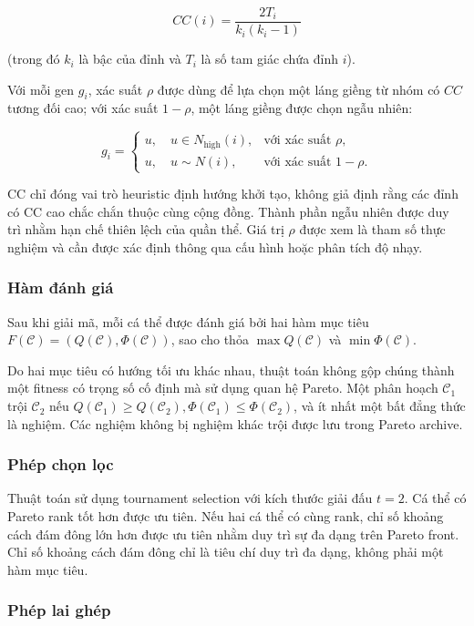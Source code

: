 \documentclass[14pt,a4paper]{extarticle}
\begin{document}
\[
CC(i)=\frac{2T_i}{k_i(k_i-1)}
\]

(trong đó $k_i$ là bậc của đỉnh và $T_i$ là số tam giác chứa đỉnh $i$).

Với mỗi gen $g_i$, xác suất $\rho$ được dùng để lựa chọn một láng giềng từ nhóm có $CC$ tương đối cao; với xác suất $1-\rho$, một láng giềng được chọn ngẫu nhiên:

\[
g_i=
\begin{cases}
u,\quad u\in N_{\mathrm{high}}(i), & \text{với xác suất }\rho,\\
u,\quad u\sim N(i), & \text{với xác suất }1-\rho.
\end{cases}
\]

CC chỉ đóng vai trò heuristic định hướng khởi tạo, không giả định rằng các đỉnh có CC cao chắc chắn thuộc cùng cộng đồng. Thành phần ngẫu nhiên được duy trì nhằm hạn chế thiên lệch của quần thể. Giá trị $\rho$ được xem là tham số thực nghiệm và cần được xác định thông qua cấu hình hoặc phân tích độ nhạy.

\subsubsection{Hàm đánh giá}

Sau khi giải mã, mỗi cá thể được đánh giá bởi hai hàm mục tiêu $
F(\mathcal C)=
\left(
Q(\mathcal C),\Phi(\mathcal C)
\right)
$, sao cho thỏa $
\max Q(\mathcal C)$ và $\min \Phi(\mathcal C).$

Do hai mục tiêu có hướng tối ưu khác nhau, thuật toán không gộp chúng thành một fitness có trọng số cố định mà sử dụng quan hệ Pareto. Một phân hoạch $\mathcal C_1$ trội $\mathcal C_2$ nếu $
Q(\mathcal C_1)\ge Q(\mathcal C_2), 
\Phi(\mathcal C_1)\le\Phi(\mathcal C_2)
$, và ít nhất một bất đẳng thức là nghiệm. Các nghiệm không bị nghiệm khác trội được lưu trong Pareto archive.

\subsubsection{Phép chọn lọc}

Thuật toán sử dụng tournament selection với kích thước giải đấu $t=2$. Cá thể có Pareto rank tốt hơn được ưu tiên. Nếu hai cá thể có cùng rank, chỉ số khoảng cách đám đông lớn hơn được ưu tiên nhằm duy trì sự đa dạng trên Pareto front. Chỉ số khoảng cách đám đông chỉ là tiêu chí duy trì đa dạng, không phải một hàm mục tiêu.

\subsubsection{Phép lai ghép}
\end{document}
